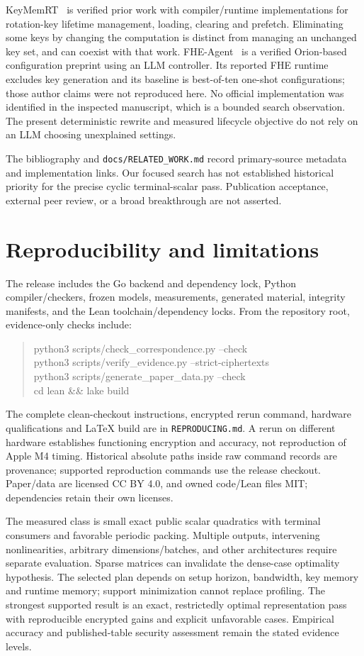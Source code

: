 \documentclass[10pt]{article}
\begin{document}
KeyMemRT~\citep{keymemrt} is verified prior work with compiler/runtime implementations for rotation-key lifetime management, loading, clearing and prefetch. Eliminating some keys by changing the computation is distinct from managing an unchanged key set, and can coexist with that work. FHE-Agent~\citep{fheagent} is a verified Orion-based configuration preprint using an LLM controller. Its reported FHE runtime excludes key generation and its baseline is best-of-ten one-shot configurations; those author claims were not reproduced here. No official implementation was identified in the inspected manuscript, which is a bounded search observation. The present deterministic rewrite and measured lifecycle objective do not rely on an LLM choosing unexplained settings.

The bibliography and \texttt{docs/RELATED\_WORK.md} record primary-source metadata and implementation links. Our focused search has not established historical priority for the precise cyclic terminal-scalar pass. Publication acceptance, external peer review, or a broad breakthrough are not asserted.

\section{Reproducibility and limitations}
The release includes the Go backend and dependency lock, Python compiler/checkers, frozen models, measurements, generated material, integrity manifests, and the Lean toolchain/dependency locks. From the repository root, evidence-only checks include:
\begin{quote}\small\ttfamily
python3 scripts/check\_correspondence.py --check\\
python3 scripts/verify\_evidence.py --strict-ciphertexts\\
python3 scripts/generate\_paper\_data.py --check\\
cd lean \&\& lake build
\end{quote}
The complete clean-checkout instructions, encrypted rerun command, hardware qualifications and LaTeX build are in \texttt{REPRODUCING.md}. A rerun on different hardware establishes functioning encryption and accuracy, not reproduction of Apple M4 timing. Historical absolute paths inside raw command records are provenance; supported reproduction commands use the release checkout. Paper/data are licensed CC BY 4.0, and owned code/Lean files MIT; dependencies retain their own licenses.

The measured class is small exact public scalar quadratics with terminal consumers and favorable periodic packing. Multiple outputs, intervening nonlinearities, arbitrary dimensions/batches, and other architectures require separate evaluation. Sparse matrices can invalidate the dense-case optimality hypothesis. The selected plan depends on setup horizon, bandwidth, key memory and runtime memory; support minimization cannot replace profiling. The strongest supported result is an exact, restrictedly optimal representation pass with reproducible encrypted gains and explicit unfavorable cases. Empirical accuracy and published-table security assessment remain the stated evidence levels.
\end{document}
